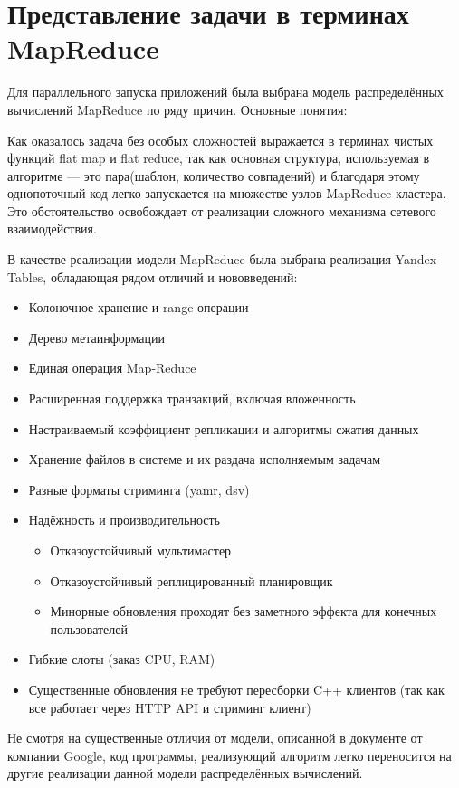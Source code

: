\section{Представление задачи в терминах MapReduce}
Для параллельного запуска приложений была выбрана модель распределённых
вычислений MapReduce по ряду причин. Основные понятия:

Как оказалось задача без особых сложностей выражается в терминах
чистых функций flat map и flat reduce, так как основная структура,
используемая в алгоритме --- это пара(шаблон, количество совпадений)
и благодаря этому однопоточный код легко запускается
на множестве узлов MapReduce-кластера. Это обстоятельство освобождает
от реализации сложного механизма сетевого взаимодействия.

В качестве реализации модели MapReduce была выбрана реализация
Yandex Tables, обладающая рядом отличий и нововведений:
\begin{itemize}
  \item Колоночное хранение и range-операции
  \item Дерево метаинформации
  \item Единая операция Map-Reduce
  \item Расширенная поддержка транзакций, включая вложенность
  \item Настраиваемый коэффициент репликации и алгоритмы сжатия данных
  \item Хранение файлов в системе и их раздача исполняемым задачам
  \item Разные форматы стриминга (yamr, dsv)
  \item Надёжность и производительность
    \begin{itemize}
      \item Отказоустойчивый мультимастер
      \item Отказоустойчивый реплицированный планировщик
      \item Минорные обновления проходят без заметного эффекта для
        конечных пользователей
    \end{itemize}
  \item Гибкие слоты (заказ CPU, RAM)
  \item Существенные обновления не требуют пересборки C++ клиентов
    (так как все работает через HTTP API и стриминг клиент)
\end{itemize}
Не смотря на существенные отличия от модели, описанной в документе от компании
Google, код программы, реализующий алгоритм легко переносится
на другие реализации данной модели распределённых вычислений.


